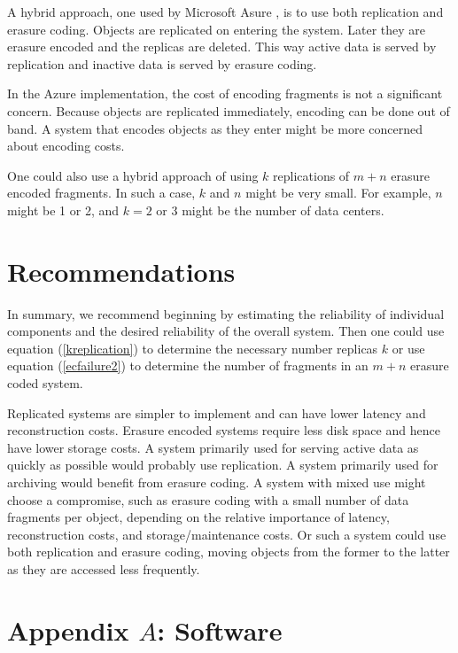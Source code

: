 \documentclass[11pt]{article}
\begin{document}
A hybrid approach, one used by Microsoft Asure \cite{lrc}, is to use both replication and erasure coding. Objects are replicated on entering the system. Later they are erasure encoded and the replicas are deleted. This way active data is served by replication and inactive data is served by erasure coding. 

In the Azure implementation, the cost of encoding fragments is not a significant concern. Because objects are replicated immediately, encoding can be done out of band. A system that encodes objects as they enter might be more concerned about encoding costs.

One could also use a hybrid approach of using $k$ replications of $m+n$ erasure encoded fragments. In such a case, $k$ and $n$ might be very small. For example, $n$ might be 1 or 2, and $k=2$ or 3 might be the number of data centers. 

\section{Recommendations}

In summary, we recommend beginning by estimating the reliability of individual components and the desired reliability of the overall system. Then one could use equation (\ref{kreplication}) to determine the necessary number replicas $k$ or use equation (\ref{ecfailure2}) to determine the number of fragments in an $m+n$ erasure coded system. 

Replicated systems are simpler to implement and can have lower latency and reconstruction costs. Erasure encoded systems require less disk space and hence have lower storage costs. A system primarily used for serving active data as quickly as possible would probably use replication. A system primarily used for archiving would benefit from erasure coding. A system with mixed use might choose a compromise, such as erasure coding with a small number of data fragments per object, depending on the relative importance of latency, reconstruction costs, and storage/maintenance costs. Or such a system could use both replication and erasure coding, moving objects from the former to the latter as they are accessed less frequently.

\section{Appendix $A$: Software} 
\end{document}
